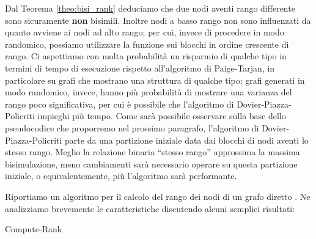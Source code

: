 Dal Teorema \ref{theo:bisi_rank} deduciamo che due nodi aventi rango differente sono sicuramente \textbf{non} bisimili. Inoltre nodi a basso rango non sono influenzati da quanto avviene ai nodi ad alto rango; per cui, invece di procedere in modo randomico, possiamo utilizzare la funzione \splitfunc sui blocchi in ordine crescente di rango. Ci aspettiamo con molta probabilità un risparmio di qualche tipo in termini di tempo di esecuzione rispetto all'algoritmo di Paige-Tarjan, in particolare su grafi che mostrano una struttura di qualche tipo; grafi generati in modo randomico, invece, hanno più probabilità di mostrare una varianza del rango poco significativa, per cui è possibile che l'algoritmo di Dovier-Piazza-Policriti impieghi più tempo. Come sarà possibile osservare sulla base dello pseudocodice che proporremo nel prossimo paragrafo, l'algoritmo di Dovier-Piazza-Policriti parte da una partizione iniziale data dai blocchi di nodi aventi lo stesso rango. Meglio la relazione binaria ``stesso rango'' approssima la massima bisimulazione, meno cambiamenti sarà necessario operare su questa partizione iniziale, o equivalentemente, più l'algoritmo sarà performante.

Riportiamo un algoritmo per il calcolo del rango dei nodi di un grafo diretto \cite{dovier}. Ne analizziamo brevemente le caratteristiche discutendo alcuni semplici risultati:
\begin{algorithm}[t!]
    \caption{Compute-Rank}
    \label{alg:rank}
\end{algorithm}

